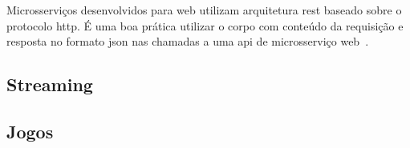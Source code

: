 Microsserviços desenvolvidos para web utilizam arquitetura \ac{rest} baseado sobre o protocolo \ac{http}.
É uma boa prática utilizar o corpo com conteúdo da requisição e resposta no formato \ac{json} nas chamadas a uma \ac{api} de microsserviço web~\cite{Nadareishvili2016Aug}.

\subsection{Streaming}

\subsection{Jogos}
